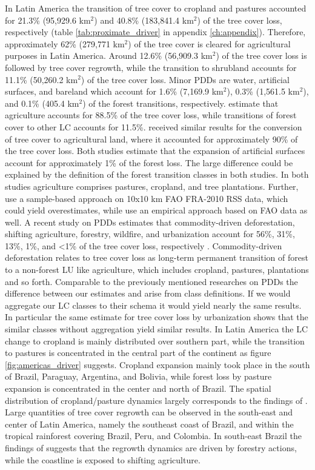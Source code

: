 			In Latin America the transition of tree cover to cropland and pastures accounted for 21.3\% (95,929.6 km$^2$) and 40.8\% (183,841.4 km$^2$) of the tree cover loss, respectively (table \ref{tab:proximate_driver} in appendix \ref{ch:appendix}). Therefore, approximately 62\% (279,771 km$^2$) of the tree cover is cleared for agricultural purposes in Latin America. Around 12.6\% (56,909.3 km$^2$) of the tree cover loss is followed by tree cover regrowth, while the transition to shrubland accounts for 11.1\% (50,260.2 km$^2$) of the tree cover loss. Minor \acp{PDD} are water, artificial surfaces, and bareland which account for 1.6\% (7,169.9 km$^2$), 0.3\% (1,561.5 km$^2$), and 0.1\% (405.4 km$^2$) of the forest transitions, respectively. \citet{Sy2015} estimate that agriculture accounts for 88.5\% of the tree cover loss, while transitions of forest cover to other \ac{LC} accounts for 11.5\%. \citet{Hosonuma2012} received similar results for the conversion of tree cover to agricultural land, where it accounted for approximately 90\% of the tree cover loss. Both studies estimate that the expansion of artificial surfaces account for approximately 1\% of the forest loss. The large difference could be explained by the definition of the forest transition classes in both studies. In both studies agriculture comprises pastures, cropland, and tree plantations. Further, \citet{Sy2015} use a sample-based approach on 10x10 km \ac{FAO} FRA-2010 RSS data, which could yield overestimates, while \citet{Hosonuma2012} use an empirical approach based on \ac{FAO} data as well. A recent study on \acp{PDD} estimates that commodity-driven deforestation, shifting agriculture, forestry, wildfire, and urbanization account for 56\%, 31\%, 13\%, 1\%, and <1\% of the tree cover loss, respectively \citep{Curtis2018}. Commodity-driven deforestation relates to tree cover loss as long-term permanent transition of forest to a non-forest \ac{LU} like agriculture, which includes cropland, pastures, plantations and so forth. Comparable to the previously mentioned researches on \acp{PDD} the difference between our estimates and \citet{Curtis2018} arise from class definitions. If we would aggregate our \ac{LC} classes to their schema it would yield nearly the same results. In particular the same estimate for tree cover loss by urbanization shows that the similar classes without aggregation yield similar results. In Latin America the \ac{LC} change to cropland is mainly distributed over southern part, while the transition to pastures is concentrated in the central part of the continent as figure \ref{fig:americas_driver} suggests. Cropland expansion mainly took place in the south of Brazil, Paraguay, Argentina, and Bolivia, while forest loss by pasture expansion is concentrated in the center and north of Brazil. The spatial distribution of cropland/pasture dynamics largely corresponds to the findings of \citet{Graesser2015}. Large quantities of tree cover regrowth can be observed in the south-east and center of Latin America, namely the southeast coast of Brazil, and within the tropical rainforest covering Brazil, Peru, and Colombia. In south-east Brazil the findings of \citet{Curtis2018} suggests that the regrowth dynamics are driven by forestry actions, while the coastline is exposed to shifting agriculture. 